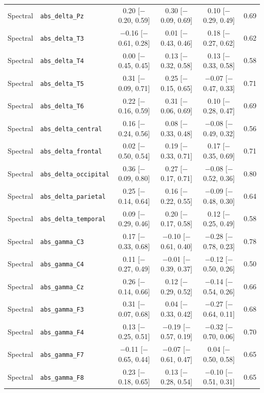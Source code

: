 {\begin{longtable}{llcccc}
Spectral & \texttt{abs\_delta\_Pz} & 0.20 [$-$0.20, 0.59] & 0.30 [$-$0.09, 0.69] & 0.10 [$-$0.29, 0.49] & 0.69 \\
Spectral & \texttt{abs\_delta\_T3} & $-$0.16 [$-$0.61, 0.28] & 0.01 [$-$0.43, 0.46] & 0.18 [$-$0.27, 0.62] & 0.62 \\
Spectral & \texttt{abs\_delta\_T4} & 0.00 [$-$0.45, 0.45] & 0.13 [$-$0.32, 0.58] & 0.13 [$-$0.33, 0.58] & 0.58 \\
Spectral & \texttt{abs\_delta\_T5} & 0.31 [$-$0.09, 0.71] & 0.25 [$-$0.15, 0.65] & $-$0.07 [$-$0.47, 0.33] & 0.71 \\
Spectral & \texttt{abs\_delta\_T6} & 0.22 [$-$0.16, 0.59] & 0.31 [$-$0.06, 0.69] & 0.10 [$-$0.28, 0.47] & 0.69 \\
Spectral & \texttt{abs\_delta\_central} & 0.16 [$-$0.24, 0.56] & 0.08 [$-$0.33, 0.48] & $-$0.08 [$-$0.49, 0.32] & 0.56 \\
Spectral & \texttt{abs\_delta\_frontal} & 0.02 [$-$0.50, 0.54] & 0.19 [$-$0.33, 0.71] & 0.17 [$-$0.35, 0.69] & 0.71 \\
Spectral & \texttt{abs\_delta\_occipital} & 0.36 [$-$0.09, 0.80] & 0.27 [$-$0.17, 0.71] & $-$0.08 [$-$0.52, 0.36] & 0.80 \\
Spectral & \texttt{abs\_delta\_parietal} & 0.25 [$-$0.14, 0.64] & 0.16 [$-$0.22, 0.55] & $-$0.09 [$-$0.48, 0.30] & 0.64 \\
Spectral & \texttt{abs\_delta\_temporal} & 0.09 [$-$0.29, 0.46] & 0.20 [$-$0.17, 0.58] & 0.12 [$-$0.25, 0.49] & 0.58 \\
Spectral & \texttt{abs\_gamma\_C3} & 0.17 [$-$0.33, 0.68] & $-$0.10 [$-$0.61, 0.40] & $-$0.28 [$-$0.78, 0.23] & 0.78 \\
Spectral & \texttt{abs\_gamma\_C4} & 0.11 [$-$0.27, 0.49] & $-$0.01 [$-$0.39, 0.37] & $-$0.12 [$-$0.50, 0.26] & 0.50 \\
Spectral & \texttt{abs\_gamma\_Cz} & 0.26 [$-$0.14, 0.66] & 0.12 [$-$0.29, 0.52] & $-$0.14 [$-$0.54, 0.26] & 0.66 \\
Spectral & \texttt{abs\_gamma\_F3} & 0.31 [$-$0.07, 0.68] & 0.04 [$-$0.33, 0.42] & $-$0.27 [$-$0.64, 0.11] & 0.68 \\
Spectral & \texttt{abs\_gamma\_F4} & 0.13 [$-$0.25, 0.51] & $-$0.19 [$-$0.57, 0.19] & $-$0.32 [$-$0.70, 0.06] & 0.70 \\
Spectral & \texttt{abs\_gamma\_F7} & $-$0.11 [$-$0.65, 0.44] & $-$0.07 [$-$0.61, 0.47] & 0.04 [$-$0.50, 0.58] & 0.65 \\
Spectral & \texttt{abs\_gamma\_F8} & 0.23 [$-$0.18, 0.65] & 0.13 [$-$0.28, 0.54] & $-$0.10 [$-$0.51, 0.31] & 0.65 \\

\end{longtable}}
